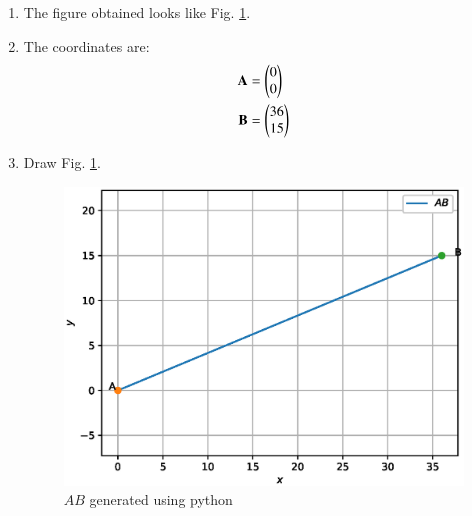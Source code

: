 \renewcommand{\theequation}{\theenumi}
\begin{enumerate}


\item The figure obtained looks like Fig. \ref{fig:dist_btw_pts2_pts_and_vectors}.\\ 

\item The coordinates are: \\
\begin{align}
\mathbf{A} &=\begin{pmatrix}0\\0\end{pmatrix} \label{eq:constr_a_pts_and_vectors}\\
\mathbf{B} &=\begin{pmatrix}36\\15\end{pmatrix} \label{eq:constr_b_pts_and_vectors}
\end{align}

\item Draw Fig. \ref{fig:dist_btw_pts2_pts_and_vectors}.

\begin{figure}[!ht]
\centering
\includegraphics[width=\columnwidth]{./figs/line_ex/pts_and_vectors/dist_bt_pts.eps}
\caption{$AB$ generated using python}
\label{fig:dist_btw_pts2_pts_and_vectors}
\end{figure} 


\end{enumerate}
